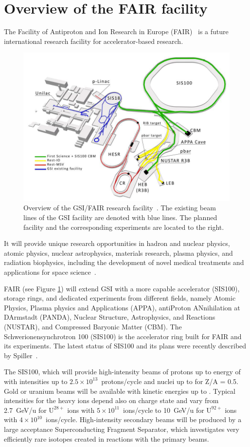 \section{Overview of the FAIR facility}
The Facility of Antiproton and Ion Research in Europe (\gls{FAIR})~\cite{fair} is a future international research facility for accelerator-based research. 

\begin{figure}[!h]
    \centering
    \includegraphics[width=0.85\columnwidth]{Chapter1/images/fair2.png}
    \caption{Overview of the GSI/FAIR research facility~\cite{fair}. The existing beam lines of the \gls{GSI} facility are denoted with blue lines. The planned facility and the corresponding experiments are located to the right.}
    \label{fig:fair}
\end{figure}

It will provide unique research opportunities in hadron and nuclear physics, atomic physics, nuclear astrophysics, materials research, plasma physics, and radiation biophysics, including the development of novel medical treatments and applications for space science~\cite{fair1}. 
 
FAIR (see Figure \ref{fig:fair}) will extend GSI with a more capable accelerator (SIS100), storage rings, and dedicated experiments from different fields, namely Atomic Physics, Plasma physics and Applications (APPA), antiProton ANnihilation at DArmstadt (PANDA), Nuclear Structure, Astrophysics, and Reactions (NUSTAR), and Compressed Baryonic Matter (\gls{CBM}). The Schwerionensynchrotron 100 (SIS100) is
the accelerator ring built for FAIR and its experiments. The latest status of SIS100 and its plans were recently described by Spiller~\cite{Spiller_2020}.

The SIS100, which will provide high-intensity beams of protons up
to energy of   with intensities up to $2.5\times 10^{13}$~protons/cycle and nuclei up to  for Z/A = 0.5. Gold or uranium beams will be available with kinetic energies up to . Typical intensities for the heavy ions depend also on charge state and vary from 2.7~GeV/u for $\mathrm{U^{28+}}$ ions with $5\times 10^{11}$~ions/cycle to 10~GeV/u for $\mathrm{U^{92+}}$ ions with $4\times 10^{10}$~ions/cycle. High-intensity secondary beams will be produced by a large acceptance Superconducting Fragment Separator, which investigates very efficiently rare isotopes created in reactions with the primary beams. 